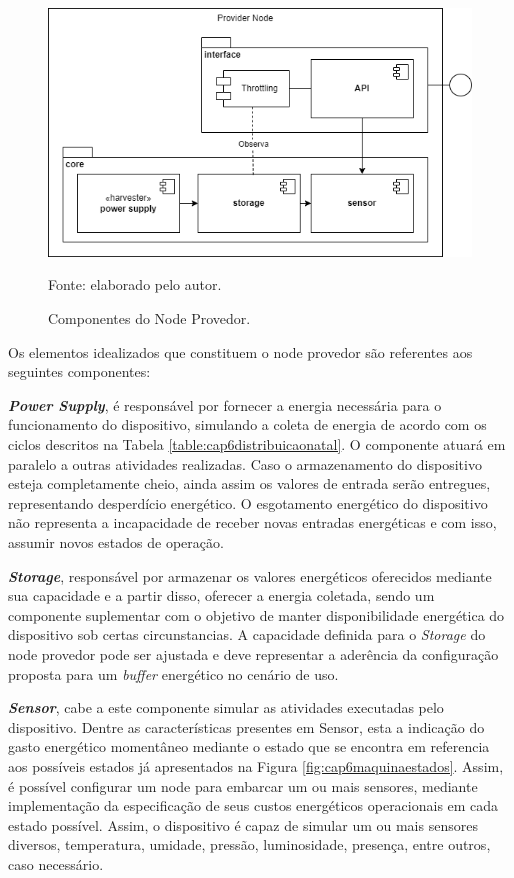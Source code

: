 \begin{figure}[H]
	\centering
	
	\caption{Componentes do Node Provedor.}
	\label{fig:cap6providernode}
	\noindent\includegraphics[width=0.75\linewidth]{Imagens/cap6/cap6providernode.png} 
	
	Fonte: elaborado pelo autor.
\end{figure}

Os elementos idealizados que constituem o node provedor são referentes aos seguintes componentes:

\textbf{\textit{Power Supply}}, é responsável por fornecer a energia necessária para o funcionamento do dispositivo, simulando a coleta de energia de acordo com os ciclos descritos na Tabela \ref{table:cap6distribuicaonatal}. O componente atuará em paralelo a outras atividades realizadas. Caso o armazenamento do dispositivo esteja completamente cheio, ainda assim os valores de entrada serão entregues, representando desperdício energético. O esgotamento energético do dispositivo não representa a incapacidade de receber novas entradas energéticas e com isso, assumir novos estados de operação.  

\textbf{\textit{Storage}}, responsável por armazenar os valores energéticos oferecidos mediante sua capacidade e a partir disso, oferecer a energia coletada, sendo um componente suplementar com o objetivo de manter disponibilidade energética do dispositivo sob certas circunstancias. A capacidade definida para o \textit{Storage} do node provedor pode ser ajustada e deve representar a aderência da configuração proposta para um \textit{buffer} energético no cenário de uso.  

\textbf{\textit{Sensor}}, cabe a este componente simular as atividades executadas pelo dispositivo. Dentre as características presentes em Sensor, esta a indicação do gasto energético momentâneo mediante o estado que se encontra em referencia aos possíveis estados já apresentados na Figura \ref{fig:cap6maquinaestados}. Assim, é possível configurar um node para embarcar um ou mais sensores, mediante implementação da especificação de seus custos energéticos operacionais em cada estado possível. Assim, o dispositivo é capaz de simular um ou mais sensores diversos, temperatura, umidade, pressão, luminosidade, presença, entre outros, caso necessário.

